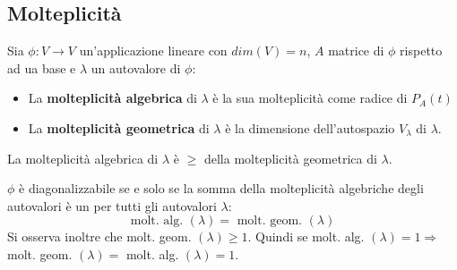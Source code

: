 \subsection{Molteplicità}
\begin{definition}
	Sia $\phi: V \to V$ un'applicazione lineare con $dim(V)=n$, $A$ matrice di $\phi$ rispetto ad ua base e $\lambda$ un autovalore di $\phi$:
	\begin{itemize}
		\item La \textbf{molteplicità algebrica} di $\lambda$ è la sua molteplicità come radice di $P_A(t)$
		\item La \textbf{molteplicità geometrica} di $\lambda$ è la dimensione dell'autospazio $V_\lambda$ di $\lambda$.
	\end{itemize}
\end{definition}

\begin{theorem}
	La molteplicità algebrica di $\lambda$ è $\geq$ della molteplicità geometrica di $\lambda$.
\end{theorem}

\begin{corollary}
	$\phi$ è diagonalizzabile se e solo se la somma della molteplicità algebriche degli autovalori è un per tutti gli autovalori $\lambda$:
	\begin{equation*}
			\text{molt. alg. }(\lambda) = \text{ molt. geom. }(\lambda)
	\end{equation*}
	Si osserva inoltre che molt. geom. $(\lambda) \geq 1$. Quindi se molt. alg. $(\lambda) = 1 \Longrightarrow $ molt. geom. $(\lambda) = $ molt. alg. $(\lambda) = 1$.
\end{corollary}